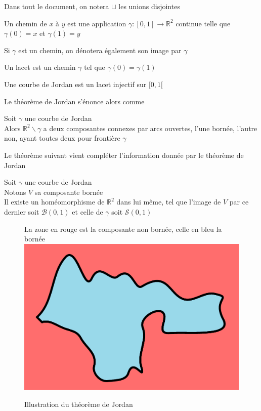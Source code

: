 \documentclass{article}
\begin{document}
\begin{flushleft}
Dans tout le document, on notera $\sqcup$ les unions disjointes\\
\begin{tcolorbox}[colback = yellow!60!white, colframe = orange!90!white, title = Définition]
    Un chemin de $x$ à $y$ est une application $\gamma : [0, 1] \longrightarrow \mathbb{R}^2$ continue telle que $\gamma(0) = x$ et $\gamma(1) = y$
\end{tcolorbox}
\vspace{0.5cm}
Si $\gamma$ est un chemin, on dénotera également son image par $\gamma$ 
\begin{tcolorbox}[colback = yellow!60!white, colframe = orange!90!white, title = Définition]
    Un lacet est un chemin $\gamma$ tel que $\gamma(0) = \gamma(1)$
\end{tcolorbox}
\vspace{0.5cm}
\begin{tcolorbox}[colback = yellow!60!white, colframe = orange!90!white, title = Définition]
    Une courbe de Jordan est un lacet injectif sur $[0, 1[$
\end{tcolorbox}
Le théorème de Jordan s'énonce alors comme
\begin{tcolorbox}[colback = purple!20!white, colframe = purple!60!white, title = Théorème de Jordan]
Soit $\gamma$ une courbe de Jordan\\
Alors $\mathbb{R}^2 \backslash \gamma$ a deux composantes connexes par arcs ouvertes, l'une bornée, l'autre non, ayant toutes deux pour
frontière $\gamma$
\end{tcolorbox}
\vspace{0.5cm}
Le théorème suivant vient compléter l'information donnée par le théorème de Jordan
\begin{tcolorbox}[colback = purple!20!white, colframe = purple!60!white, title = Théorème de Jordan-Schönflies]
    Soit $\gamma$ une courbe de Jordan\\
    Notons $V$ sa composante bornée\\
    Il existe un homéomorphisme de $\mathbb{R}^2$ dans lui même, tel que l'image de $V$ par ce dernier
    soit $\mathcal{B}(0, 1)$ et celle de $\gamma$ soit $\mathcal{S}(0, 1)$
\end{tcolorbox}
\vspace{0.5cm}

\begin{figure}[h]
    \caption{Illustration du théorème de Jordan}
    \centering
    La zone en rouge est la composante non bornée, celle en bleu la bornée\\
    \vspace*{0.2cm}
    \includegraphics[width = 0.6 \textwidth]{Jordan.png}


\end{figure}
\end{flushleft}
\end{document}
